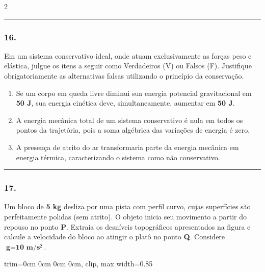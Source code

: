 \documentclass[twoside, 10pt, a4paper]{article}
\newlength{\espacoPreQuestao}\setlength{\espacoPreQuestao}{0.1cm}
\newlength{\espacoQuestao}\setlength{\espacoQuestao}{0.2cm}
\newlength{\espacoAlt}\setlength{\espacoAlt}{0.2cm}
\newcommand{\larguraTikz}{0.85\linewidth}
\begin{document}
\begin{multicols*}{2}
\noindent\textcolor{CorLinha}{\rule{\linewidth}{0.5pt}} 
\par\vspace{\espacoPreQuestao}
\subsubsection*{16.} Em um sistema conservativo ideal, onde atuam exclusivamente as forças peso e elástica, julgue os itens a seguir como Verdadeiros (V) ou Falsos (F). Justifique obrigatoriamente as alternativas falsas utilizando o princípio da conservação.
\begin{enumerate}[label=\Roman*., itemsep=\espacoAlt]
    \item Se um corpo em queda livre diminui sua energia potencial gravitacional em \textbf{50 J}, sua energia cinética deve, simultaneamente, aumentar em \textbf{50 J}.
    \item A energia mecânica total de um sistema conservativo é nula em todos os pontos da trajetória, pois a soma algébrica das variações de energia é zero.
    \item A presença de atrito do ar transformaria parte da energia mecânica em energia térmica, caracterizando o sistema como não conservativo.
\end{enumerate}
\par\vspace{\espacoQuestao}

\noindent\textcolor{CorLinha}{\rule{\linewidth}{0.5pt}} 
\par\vspace{\espacoPreQuestao}
\subsubsection*{17.} Um bloco de \textbf{5 kg} desliza por uma pista com perfil curvo, cujas superfícies são perfeitamente polidas (sem atrito). O objeto inicia seu movimento a partir do repouso no ponto \textbf{P}. Extraia os desníveis topográficos apresentados na figura e calcule a velocidade do bloco ao atingir o platô no ponto \textbf{Q}. Considere $ \textbf{g} = \textbf{10 m/s²} $.
\begin{center}
\begin{adjustbox}{trim=0cm 0cm 0cm 0cm, clip, max width=\larguraTikz}
\end{adjustbox}
\end{center}
\end{multicols*}
\end{document}
